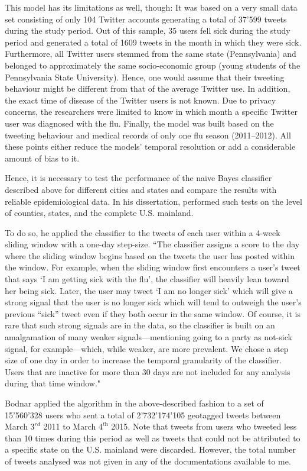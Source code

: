 \documentclass[11pt, a4paper,twoside]{report}\usepackage[]{graphicx}\usepackage[]{color}
\begin{document}
This model has its limitations as well, though: It was based on a very small data set consisting of only 104 Twitter accounts generating a total of 37’599 tweets during the study period. Out of this sample, 35 users fell sick during the study period and generated a total of 1609 tweets in the month in which they were sick. Furthermore, all Twitter users stemmed from the same state (Pennsylvania) and belonged to approximately the same socio-economic group (young students of the Pennsylvania State University). Hence, one would assume that their tweeting behaviour might be different from that of the average Twitter use. In addition, the exact time of disease of the Twitter users is not known. Due to privacy concerns, the researchers were limited to know in which month a specific Twitter user was diagnosed with the flu. Finally, the model was built based on the tweeting behaviour and medical records of only one flu season (2011--2012). All these points either reduce the models' temporal resolution or add a considerable amount of bias to it.

Hence, it is necessary to test the performance of the naive Bayes classifier described above for different cities and states and compare the results with reliable epidemiological data. In his dissertation, \cite{bodnar_data_2015} performed such tests on the level of counties, states, and the complete U.S. mainland.

To do so, he applied the classifier to the tweets of each user within a 4-week sliding window with a one-day step-size. ``The classifier assigns a score to the day where the sliding window begins based on the tweets the user has posted within the window. For example, when the sliding window first encounters a user’s tweet that says `I am getting sick with the flu', the classifier will heavily lean toward her being sick. Later, the user may tweet `I am no longer sick' which will give a strong signal that the user is no longer sick which will tend to outweigh the user’s previous “sick” tweet even if they both occur in the same window. Of course, it is rare that such strong signals are in the data, so the classifier is built on an amalgamation of many weaker signals—mentioning going to a party as not-sick signal, for example---which, while weaker, are more prevalent. We chose a step size of one day in order to increase the temporal granularity of the classifier. Users that are inactive for more than 30 days are not included for any analysis during that time window."

Bodnar applied the algorithm in the above-described fashion to a set of 15'560'328 users who sent a total of 2'732'174'105 geotagged tweets between March $3^\textit{rd}$ 2011 to March $4^\textit{th}$ 2015. Note that tweets from users who tweeted less than 10 times during this period as well as tweets that could not be attributed to a specific state on the U.S. mainland were discarded. However, the total number of tweets analysed was not given in any of the documentations available to me. 
\end{document}
